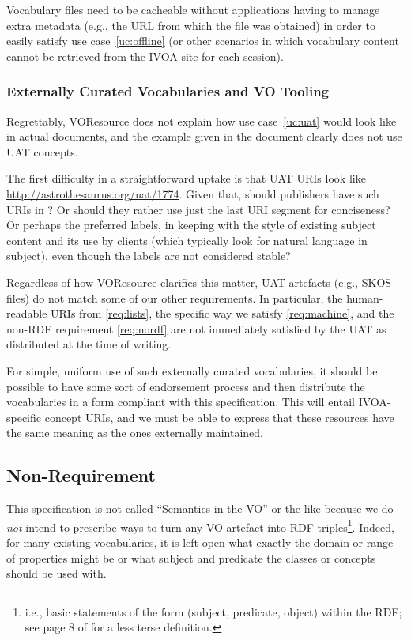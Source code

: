 \documentclass[11pt,a4paper]{ivoa}
\begin{document}
Vocabulary files need to be cacheable without applications having to
manage extra metadata (e.g., the URL from which the file was obtained)
in order to easily satisfy use case~\ref{uc:offline} (or other scenarios
in which vocabulary content cannot be retrieved from the IVOA
site for each session).

\subsubsection{Externally Curated Vocabularies and VO Tooling}
\label{req:external}

Regrettably, VOResource does not explain how use case~\ref{uc:uat} would
look like in actual documents, and the example given in the document
clearly does not use UAT concepts. 

The first difficulty in a straightforward uptake is that UAT URIs look
like \url{http://astrothesaurus.org/uat/1774}. Given that, should
publishers have such URIs in ?  Or should they rather use
just the last URI segment for conciseness?  Or perhaps the preferred
labels, in keeping with the style of existing subject content and its
use by clients (which typically look for natural language in subject),
even though the labels are not considered stable?

Regardless of how VOResource clarifies this matter, UAT artefacts (e.g.,
SKOS files) do not match some of our other requirements. In particular,
the human-readable URIs from \ref{req:lists}, the specific way we
satisfy \ref{req:machine}, and the non-RDF requirement \ref{req:nordf} are
not immediately satisfied by the UAT as distributed at the time of
writing.

For simple, uniform use of such externally curated vocabularies, it
should be possible to have some sort of endorsement process and then
distribute the vocabularies in a form compliant with this specification.
This will entail IVOA-specific concept URIs, and we must be able to
express that these resources have the same meaning as the ones
externally maintained.


\subsection{Non-Requirement}

This specification is not called ``Semantics in the VO'' or the like
because we do \emph{not} intend to prescribe ways to turn any VO
artefact into RDF triples\footnote{i.e., basic statements of the form
(subject, predicate, object) within the
RDF; see page 8 of \citet{local:normanspaper} for a less terse
definition.}.  
Indeed, for many existing vocabularies, it
is left open what exactly the domain or range of properties might be or
what subject and predicate the classes or concepts should be used with.
\end{document}
